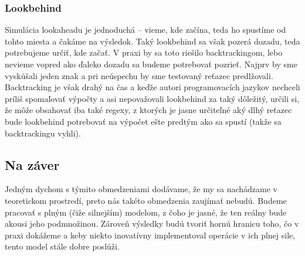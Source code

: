\subsubsection{Lookbehind}
\label{praxlb}

Simulácia lookaheadu je jednoduchá -- vieme, kde začína, teda ho spustíme od tohto miesta a čakáme na výsledok. Taký lookbehind sa však pozerá dozadu, teda potrebujeme určiť, kde začať. V praxi by sa toto riešilo backtrackingom, lebo nevieme vopred ako ďaleko dozadu sa budeme potrebovať pozrieť. Najprv by sme vyskúšali jeden znak a pri neúspechu by sme testovaný reťazec predlžovali. Backtracking je však drahý na čas a keďže autori programovacích jazykov nechceli príliš spomaľovať výpočty a asi nepovažovali lookbehind za taký dôležitý, určili si, že môže obsahovať iba také regexy, z ktorých je jasne určiteľné aký dlhý reťazec bude lookbehind potrebovať na výpočet ešte predtým ako sa spustí (takže sa backtrackingu vyhli)\cite{LApracticalnote}. 

\subsection*{Na záver}
\label{praxzaver}

Jedným dychom s týmito obmedzeniami dodávame, že my sa nachádzame v teo\-re\-tic\-kom prostredí, preto nás takéto obmedzenia zaujímať nebudú. Budeme pracovať s plným (čiže silnejším) modelom, z čoho je jasné, že ten reálny bude akousi jeho pod\-mno\-ži\-nou. Zároveň výsledky budú tvoriť hornú hranicu toho, čo v praxi dokážeme a keby niekto inovatívny implementoval operácie v ich plnej sile, tento model stále dobre poslúži.